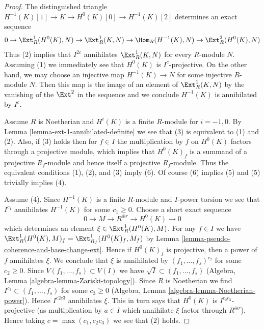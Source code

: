 \begin{proof}
The distinguished triangle $H^{-1}(K)[1] \to K \to H^0(K)[0] \to H^{-1}(K)[2]$
determines an exact sequence
$$
0 \to \Ext^1_R(H^0(K), N) \to \Ext^1_R(K, N) \to \Hom_R(H^{-1}(K), N) \to
\Ext^2_R(H^0(K), N)
$$
Thus (2) implies that $I^{2c}$ annihilates $\Ext^1_R(K, N)$ for every
$R$-module $N$. Assuming (1) we immediately see that $H^0(K)$ is
$I^c$-projective. On the other hand, we may choose an injective map
$H^{-1}(K) \to N$ for some injective $R$-module $N$. Then this map
is the image of an element of $\Ext^1_R(K, N)$ by the vanishing
of the $\Ext^2$ in the sequence and we conclude $H^{-1}(K)$
is annihilated by $I^c$.

\medskip\noindent
Assume $R$ is Noetherian and $H^i(K)$ is a finite $R$-module
for $i = -1, 0$. By Lemma \ref{lemma-ext-1-annihilated-definite}
we see that (3) is equivalent to (1) and (2). Also, if (3)
holds then for $f \in I$ the multiplication by $f$ on
$H^0(K)$ factors through a projective module, which implies
that $H^0(K)_f$ is a summand of a projective $R_f$-module and hence
itself a projective $R_f$-module. Thus the equivalent conditions
(1), (2), and (3) imply (6).
Of course (6) implies (5) and (5) trivially implies (4).

\medskip\noindent
Assume (4). Since $H^{-1}(K)$ is a finite $R$-module and $I$-power torsion
we see that $I^{c_1}$ annihilates $H^{-1}(K)$ for some $c_1 \geq 0$.
Choose a short exact sequence
$$
0 \to M \to R^{\oplus r} \to H^0(K) \to 0
$$
which determines an element $\xi \in \Ext^1_R(H^0(K), M)$.
For any $f \in I$ we have $\Ext^1_R(H^0(K), M)_f = \Ext^1_{R_f}(H^0(K)_f, M_f)$
by Lemma \ref{lemma-pseudo-coherence-and-base-change-ext}.
Hence if $H^0(K)_f$ is projective, then a power of $f$ annihilates $\xi$.
We conclude that $\xi$ is annihilated by $(f_1, \ldots, f_s)^{c_2}$
for some $c_2 \geq 0$. Since $V(f_1, \ldots, f_s) \subset V(I)$ we have
$\sqrt{I} \subset (f_1, \ldots, f_s)$
(Algebra, Lemma \ref{algebra-lemma-Zariski-topology}).
Since $R$ is Noetherian we find $I^{c_3} \subset (f_1, \ldots, f_s)$
for some $c_3 \geq 0$ (Algebra, Lemma \ref{algebra-lemma-Noetherian-power}).
Hence $I^{c2c3}$ annihilates $\xi$.
This in turn says that $H^0(K)$ is $I^{c_2c_3}$-projective (as multiplication
by $a \in I$ which annihilate $\xi$ factor through $R^{\oplus r}$).
Hence taking $c = \max(c_1, c_2c_3)$ we see that (2) holds.
\end{proof}